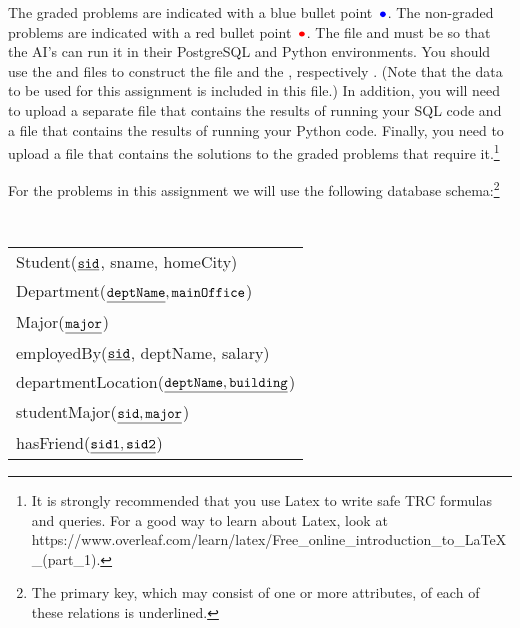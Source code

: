 \documentclass{article}
\newcommand{\red}[1]{{\color{red}#1}}
\newcommand{\blue}[1]{{\color{blue}#1}}
\newcommand{\redbullet}{$\red{\bullet}$}
\newcommand{\bluebullet}{$\blue{\bullet}$}
\begin{document}
The graded problems are indicated with a blue bullet point\ \bluebullet.   The non-graded problems are indicated with a red bullet point\ \redbullet.
The \blue{{\tt assignment1.sql}} file and \blue{{\tt assignment1.py}} must be so that the AI's can run it in their PostgreSQL and Python environments.
You should use the \blue{{\tt Assignment1Script.sql}} and
\blue{{\tt Assignment1Script.py}} files to construct the 
\blue{{\tt assignment1.sql}} 
file and the \blue{{\tt assignment1.py}}, respectively . 
(Note that the data to be used for this assignment is included in this file.)
In addition, you will need to upload a separate 
\blue{{\tt assignment1SQL.txt}} 
file that contains the results of running
your SQL code and a \blue{{\tt assignment1Python.txt}} 
file that contains the results of running
your Python code.
Finally, you need to upload a file 
 \blue{{\tt assignment1.pdf}} 
that contains the solutions to the graded problems that require it.\footnote{It is strongly recommended that you use Latex to write safe TRC formulas and queries.
For a good way to learn about Latex, look at 
https://www.overleaf.com/learn/latex/Free\_online\_introduction\_to\_LaTeX\_(part\_1).
}

For the problems in this assignment we will use the following database schema:\footnote{The primary key, which may consist of one or more attributes, of each of these relations is underlined.}

\begin{center}
{\tt
  \begin{tabular}{l}
  {Student}($\underline{\tt sid}$, sname, homeCity) \\
  {Department}($\underline{\tt deptName}, {\tt mainOffice}$) \\
  {Major}($\underline{\tt major}$) \\
  {employedBy}($\underline{\tt sid}$, deptName, salary) \\
  {departmentLocation}($\underline{\tt deptName, building}$) \\
  {studentMajor}($\underline{\tt sid, major}$) \\
  {hasFriend}($\underline{\tt sid1, sid2}$) \\
  \end{tabular}
  }
\end{center}
\end{document}
